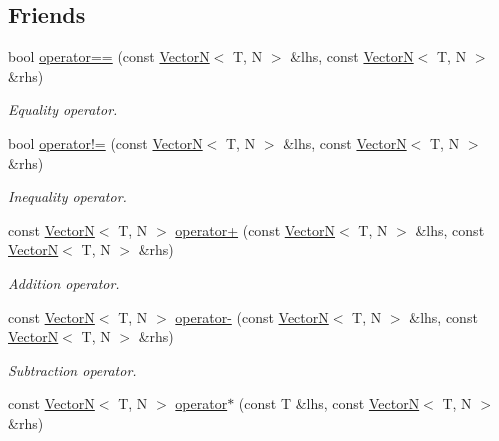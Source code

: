 \subsection*{\-Friends}
\begin{DoxyCompactItemize}
\item 
bool \hyperlink{classmetrobotics_1_1VectorN_aa4109d8f4399db9986b1492ece5efaf6}{operator==} (const \hyperlink{classmetrobotics_1_1VectorN}{\-Vector\-N}$<$ \-T, \-N $>$ \&lhs, const \hyperlink{classmetrobotics_1_1VectorN}{\-Vector\-N}$<$ \-T, \-N $>$ \&rhs)
\begin{DoxyCompactList}\small\item\em \-Equality operator. \end{DoxyCompactList}\item 
bool \hyperlink{classmetrobotics_1_1VectorN_afd6f4e9e2b34521b3661e65ec69cd9d3}{operator!=} (const \hyperlink{classmetrobotics_1_1VectorN}{\-Vector\-N}$<$ \-T, \-N $>$ \&lhs, const \hyperlink{classmetrobotics_1_1VectorN}{\-Vector\-N}$<$ \-T, \-N $>$ \&rhs)
\begin{DoxyCompactList}\small\item\em \-Inequality operator. \end{DoxyCompactList}\item 
const \hyperlink{classmetrobotics_1_1VectorN}{\-Vector\-N}$<$ \-T, \-N $>$ \hyperlink{classmetrobotics_1_1VectorN_a66a4f550ea8629a3432151318b086a90}{operator+} (const \hyperlink{classmetrobotics_1_1VectorN}{\-Vector\-N}$<$ \-T, \-N $>$ \&lhs, const \hyperlink{classmetrobotics_1_1VectorN}{\-Vector\-N}$<$ \-T, \-N $>$ \&rhs)
\begin{DoxyCompactList}\small\item\em \-Addition operator. \end{DoxyCompactList}\item 
const \hyperlink{classmetrobotics_1_1VectorN}{\-Vector\-N}$<$ \-T, \-N $>$ \hyperlink{classmetrobotics_1_1VectorN_a2b7db8a08251033a4a1684c0cd01f066}{operator-\/} (const \hyperlink{classmetrobotics_1_1VectorN}{\-Vector\-N}$<$ \-T, \-N $>$ \&lhs, const \hyperlink{classmetrobotics_1_1VectorN}{\-Vector\-N}$<$ \-T, \-N $>$ \&rhs)
\begin{DoxyCompactList}\small\item\em \-Subtraction operator. \end{DoxyCompactList}\item 
const \hyperlink{classmetrobotics_1_1VectorN}{\-Vector\-N}$<$ \-T, \-N $>$ \hyperlink{classmetrobotics_1_1VectorN_afc885bae8dfe6bd1a665be0826705057}{operator$\ast$} (const \-T \&lhs, const \hyperlink{classmetrobotics_1_1VectorN}{\-Vector\-N}$<$ \-T, \-N $>$ \&rhs)

\end{DoxyCompactItemize}
